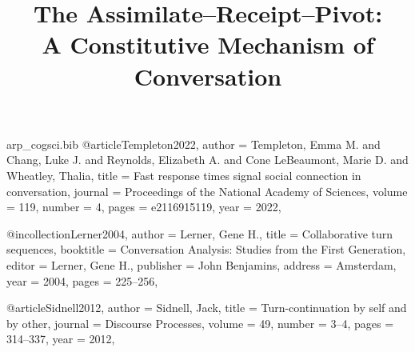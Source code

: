\begin{filecontents*}[overwrite]{arp_cogsci.bib}
@article{Templeton2022,
  author  = {Templeton, Emma M. and Chang, Luke J. and Reynolds, Elizabeth A. and Cone LeBeaumont, Marie D. and Wheatley, Thalia},
  title   = {Fast response times signal social connection in conversation},
  journal = {Proceedings of the National Academy of Sciences},
  volume  = {119},
  number  = {4},
  pages   = {e2116915119},
  year    = {2022},
}

@incollection{Lerner2004,
  author    = {Lerner, Gene H.},
  title     = {Collaborative turn sequences},
  booktitle = {Conversation Analysis: Studies from the First Generation},
  editor    = {Lerner, Gene H.},
  publisher = {John Benjamins},
  address   = {Amsterdam},
  year      = {2004},
  pages     = {225--256},
}

@article{Sidnell2012,
  author  = {Sidnell, Jack},
  title   = {Turn-continuation by self and by other},
  journal = {Discourse Processes},
  volume  = {49},
  number  = {3--4},
  pages   = {314--337},
  year    = {2012},
}

\end{filecontents*}

\documentclass[11pt,letterpaper]{article}
\usepackage[margin=1in]{geometry}
\usepackage{setspace}
\usepackage{microtype}
\usepackage{titlesec}
\usepackage{enumitem}
\usepackage{parskip}
\usepackage[hidelinks]{hyperref}
\usepackage{tikz}
\usetikzlibrary{arrows.meta,positioning,calc}
\usepackage{natbib}


\titleformat{\section}{\normalfont\large\bfseries}{\thesection}{0.7em}{}
\titleformat{\subsection}{\normalfont\normalsize\bfseries}{\thesubsection}{0.7em}{}
\titleformat{\paragraph}[runin]{\normalfont\normalsize\bfseries}{}{0pt}{}[.]

\setlength{\parindent}{0pt}
\setlength{\parskip}{0.6em}
\onehalfspacing

\title{\textbf{The Assimilate--Receipt--Pivot:\\A Constitutive Mechanism of Conversation}}
\author{}
\date{}


